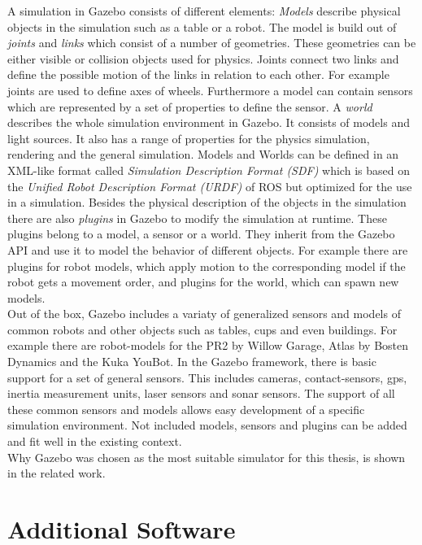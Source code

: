 A simulation in Gazebo consists of different elements: \textit{Models} describe physical objects in the simulation such as a table or a robot. The model is build out of \textit{joints} and \textit{links} which consist of a number of geometries. These geometries can be either visible or collision objects used for physics. Joints connect two links and define the possible motion of the links in relation to each other. For example joints are used to define axes of wheels. Furthermore a model can contain sensors which are represented by a set of properties to define the sensor. A \textit{world} describes the whole simulation environment in Gazebo. It consists of models and light sources. It also has a range of properties for the physics simulation, rendering and the general simulation. Models and Worlds can be defined in an XML-like format called \textit{Simulation Description Format (SDF)} which is based on the \textit{Unified Robot Description Format (URDF)} of ROS but optimized for the use in a simulation. Besides the physical description of the objects in the simulation there are also \textit{plugins} in Gazebo to modify the simulation at runtime. These plugins belong to a model, a sensor or a world. They inherit from the Gazebo API and use  it to model the behavior of different objects. For example there are plugins for robot models, which apply motion to the corresponding model if the robot gets a movement order, and plugins for the world, which can spawn new models.\\
Out of the box, Gazebo includes a variaty of generalized sensors and models of common robots and other objects such as tables, cups and even buildings. For example there are robot-models for the PR2 by Willow Garage, Atlas by Bosten Dynamics and the Kuka YouBot. In the Gazebo framework, there is basic support for a set of general sensors. This includes cameras, contact-sensors, gps, inertia measurement units, laser sensors and sonar sensors. The support of all these common sensors and models allows easy development of a specific simulation environment. Not included models, sensors and plugins can be added and fit well in the existing context.\\
Why Gazebo was chosen as the most suitable simulator for this thesis, is shown in the related work.


\section{Additional Software}

